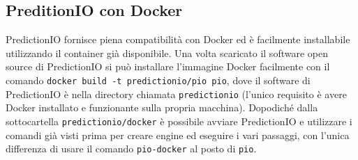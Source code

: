 \subsection{PreditionIO con Docker}
PredictionIO fornisce piena compatibilità con Docker ed è facilmente installabile utilizzando il container già disponibile. Una volta scaricato il software open source di PredictionIO si può installare l'immagine Docker facilmente con il comando \verb+docker build -t predictionio/pio pio+, dove il software di PredictionIO è nella directory chiamata \verb+predictionio+ (l'unico requisito è avere Docker installato e funzionante sulla propria macchina). Dopodiché dalla sottocartella \verb+predictionio/docker+ è possibile avviare PredictionIO e utilizzare i comandi già visti prima per creare engine ed eseguire i vari passaggi, con l'unica differenza di usare il comando \verb+pio-docker+ al posto di \verb+pio+.